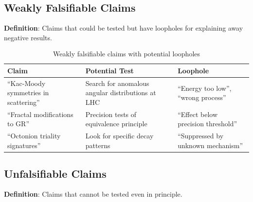 \subsection{Weakly Falsifiable Claims}

\textbf{Definition}: Claims that could be tested but have loopholes for explaining away negative results.

\begin{table}[H]
\centering
\small
\begin{tabular}{lp{5cm}p{5cm}}
\toprule
\textbf{Claim} & \textbf{Potential Test} & \textbf{Loophole} \\
\midrule
``Kac-Moody symmetries in scattering'' & Search for anomalous angular distributions at LHC & ``Energy too low'', ``wrong process'' \\
``Fractal modifications to GR'' & Precision tests of equivalence principle & ``Effect below precision threshold'' \\
``Octonion triality signatures'' & Look for specific decay patterns & ``Suppressed by unknown mechanism'' \\
\bottomrule
\end{tabular}
\caption{Weakly falsifiable claims with potential loopholes}
\end{table}

\subsection{Unfalsifiable Claims}

\textbf{Definition}: Claims that cannot be tested even in principle.

